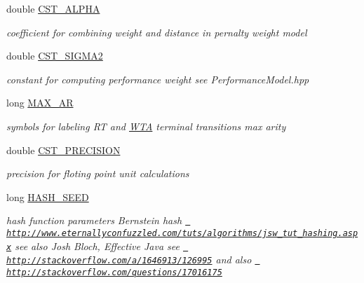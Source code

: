 \begin{DoxyCompactItemize}
\mbox{\label{group__general_ga4f8704310ab1a776374c4103a70ee4ca}} 
double \mbox{\hyperlink{group__general_ga4f8704310ab1a776374c4103a70ee4ca}{C\+S\+T\+\_\+\+A\+L\+P\+HA}}
\begin{DoxyCompactList}\small\item\em coefficient for combining weight and distance in pernalty weight model \end{DoxyCompactList}\item 
\mbox{\label{group__general_gae30e96a43768e59d69b30739bca4b2a0}} 
double \mbox{\hyperlink{group__general_gae30e96a43768e59d69b30739bca4b2a0}{C\+S\+T\+\_\+\+S\+I\+G\+M\+A2}}
\begin{DoxyCompactList}\small\item\em constant for computing performance weight see Performance\+Model.\+hpp \end{DoxyCompactList}\item 
\mbox{\label{group__general_ga9ba08947d7e5ebba9df19496146a1bd4}} 
long \mbox{\hyperlink{group__general_ga9ba08947d7e5ebba9df19496146a1bd4}{M\+A\+X\+\_\+\+AR}}
\begin{DoxyCompactList}\small\item\em symbols for labeling RT and \mbox{\hyperlink{classWTA}{W\+TA}} terminal transitions max arity \end{DoxyCompactList}\item 
\mbox{\label{group__general_gaa0818f0d579fa65f854f7540dab4d258}} 
double \mbox{\hyperlink{group__general_gaa0818f0d579fa65f854f7540dab4d258}{C\+S\+T\+\_\+\+P\+R\+E\+C\+I\+S\+I\+ON}}
\begin{DoxyCompactList}\small\item\em precision for floting point unit calculations \end{DoxyCompactList}\item 
long \mbox{\hyperlink{group__general_gae18ed995d696579fcc6018d8e9993e65}{H\+A\+S\+H\+\_\+\+S\+E\+ED}}
\begin{DoxyCompactList}\small\item\em hash function parameters Bernstein hash \href{http://www.eternallyconfuzzled.com/tuts/algorithms/jsw_tut_hashing.aspx}{\texttt{ http\+://www.\+eternallyconfuzzled.\+com/tuts/algorithms/jsw\+\_\+tut\+\_\+hashing.\+aspx}} see also Josh Bloch, Effective Java see \href{http://stackoverflow.com/a/1646913/126995}{\texttt{ http\+://stackoverflow.\+com/a/1646913/126995}} and also \href{http://stackoverflow.com/questions/17016175}{\texttt{ http\+://stackoverflow.\+com/questions/17016175}} \end{DoxyCompactList}\item 

\end{DoxyCompactItemize}
